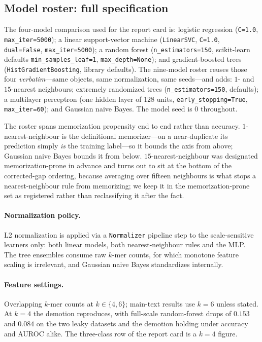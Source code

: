 \documentclass[11pt,a4paper]{article}
\begin{document}
\subsection{Model roster: full specification}\label{sec:s-roster}
The four-model comparison used for the report card is: logistic regression (\texttt{C=1.0},
\texttt{max\_iter=5000}); a linear support-vector machine (\texttt{LinearSVC}, \texttt{C=1.0},
\texttt{dual=False}, \texttt{max\_iter=5000}); a random forest (\texttt{n\_estimators=150},
scikit-learn defaults \texttt{min\_samples\_leaf=1}, \texttt{max\_depth=None}); and gradient-boosted
trees (\texttt{HistGradientBoosting}, library defaults). The nine-model roster reuses those four
\emph{verbatim}---same objects, same normalization, same seeds---and adds: $1$- and $15$-nearest
neighbours; extremely randomized trees (\texttt{n\_estimators=150}, defaults); a multilayer
perceptron (one hidden layer of $128$ units, \texttt{early\_stopping=True}, \texttt{max\_iter=60});
and Gaussian naive Bayes. The model seed is $0$ throughout.

The roster spans memorization propensity end to end rather than accuracy. $1$-nearest-neighbour is
the definitional memorizer---on a near-duplicate its prediction simply \emph{is} the training
label---so it bounds the axis from above; Gaussian naive Bayes bounds it from below.
$15$-nearest-neighbour was designated memorization-prone in advance and turns out to sit at the
bottom of the corrected-gap ordering, because averaging over fifteen neighbours is what stops a
nearest-neighbour rule from memorizing; we keep it in the memorization-prone set as registered
rather than reclassifying it after the fact.

\paragraph{Normalization policy.} L2 normalization is applied via a \texttt{Normalizer} pipeline
step to the scale-sensitive learners only: both linear models, both nearest-neighbour rules and the
MLP. The tree ensembles consume raw $k$-mer counts, for which monotone feature scaling is
irrelevant, and Gaussian naive Bayes standardizes internally.

\paragraph{Feature settings.} Overlapping $k$-mer counts at $k\in\{4,6\}$; main-text results use
$k=6$ unless stated. At $k=4$ the demotion reproduces, with full-scale random-forest drops of
$0.153$ and $0.084$ on the two leaky datasets and the demotion holding under accuracy and AUROC
alike. The three-class row of the report card is a $k=4$ figure.
\end{document}

